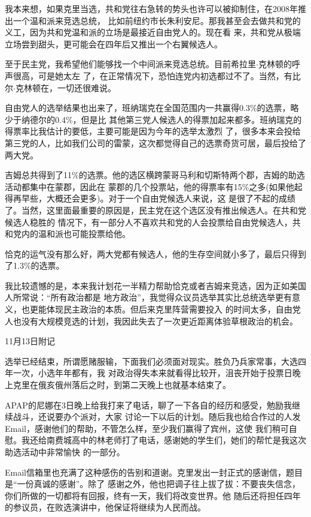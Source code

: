 ﻿\documentclass[11pt]{article}
\begin{document}
我本来想，如果克里当选，共和党往右急转的势头也许可以被抑制住，在2008年推出一个温和派来竞选总统，
比如前纽约市长朱利安尼。那我甚至会去做共和党的义工，因为共和党温和派的立场是最接近自由党人的。现在看
来，共和党从极端立场尝到甜头，更可能会在四年后又推出一个右翼候选人。

至于民主党，我希望他们能够找一个中间派来竞选总统。目前希拉里$\cdot$克林顿的呼声很高，可是她太左
了，在正常情况下，恐怕连党内初选都过不了。当然，有比尔$\cdot$克林顿在，一切还很难说。

自由党人的选举结果也出来了，班纳瑞克在全国范围内一共赢得0.3\%的选票，略少于纳德尔的0.4\%，但是比
其他第三党人候选人的得票加起来都多。班纳瑞克的得票率比我估计的要低，主要可能是因为今年的选举太激烈
了，很多本来会投给第三党的人，比如我们公司的雷蒙，这次都觉得自己的选票奇货可居，最后投给了两大党。

吉姆总共得到了11\%的选票。他的选区横跨蒙哥马利和切斯特两个郡，吉姆的助选活动都集中在蒙郡，因此在
蒙郡的几个投票站，他的得票率有15\%之多(如果他起得再早些，大概还会更多)。对于一个自由党候选人来说，这
是很了不起的成绩了。当然，这里面最重要的原因是，民主党在这个选区没有推出候选人。在共和党候选人稳胜的
情况下，有一部分人不喜欢共和党的人会投票给自由党候选人，共和党内的温和派也可能投票给他。

恰克的运气没有那么好，两大党都有候选人，他的生存空间就小多了，最后只得到了1.3\%的选票。

我比较遗憾的是，本来我计划花一半精力帮助恰克或者吉姆来竞选，因为正如美国人所常说：``所有政治都是
地方政治''，我觉得众议员选举其实比总统选举更有意义，也更能体现民主政治的本质。但后来克里阵营需要投入
的时间太多，自由党人也没有大规模竞选的计划，我因此失去了一次更近距离体验草根政治的机会。

11月13日附记

选举已经结束，所谓愿赌服输，下面我们必须面对现实。胜负乃兵家常事，大选四年一次，小选年年都有，我
对政治得失本来就看得比较开，沮丧开始于投票日晚上克里在俄亥俄州落后之时，到第二天晚上也就基本结束了。

APAP的尼娜在3日晚上给我打来了电话，聊了一下各自的经历和感受，勉励我继续战斗，还说要办个派对，大家
讨论一下以后的计划。随后我也给合作过的人发Email，感谢他们的帮助，不管怎么样，至少我们赢得了宾州，这使
我们稍可自慰。我还给南费城高中的林老师打了电话，感谢她的学生们，她们的帮忙是我这次助选活动中非常愉快
的一部分。

Email信箱里也充满了这种感伤的告别和道谢。克里发出一封正式的感谢信，题目是``一份真诚的感谢''。除了
感谢之外，他也把调子往上拔了拔：不要丧失信念，你们所做的一切都将有回报，终有一天，我们将改变世界。他
随后还将担任四年的参议员，在败选演讲中，他保证将继续为人民而战。
\end{document}
